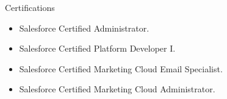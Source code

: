 \documentclass[11pt]{resume}
\begin{document}
    \begin{rSection}{Certifications}
        \begin{itemize}
            \item   Salesforce Certified Administrator.
            \item   Salesforce Certified Platform Developer I.
            \item   Salesforce Certified Marketing Cloud Email Specialist.
            \item   Salesforce Certified Marketing Cloud Administrator.
        \end{itemize}
    \end{rSection}
\end{document}
